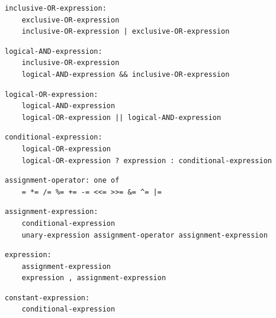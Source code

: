 \noindent\textbf{\texttt{}}\par
\begin{lstlisting}
inclusive-OR-expression:
    exclusive-OR-expression
    inclusive-OR-expression | exclusive-OR-expression
\end{lstlisting}

\noindent\textbf{\texttt{}}\par
\begin{lstlisting}
logical-AND-expression:
    inclusive-OR-expression
    logical-AND-expression && inclusive-OR-expression
\end{lstlisting}

\noindent\textbf{\texttt{}}\par
\begin{lstlisting}
logical-OR-expression:
    logical-AND-expression
    logical-OR-expression || logical-AND-expression
\end{lstlisting}

\noindent\textbf{\texttt{}}\par
\begin{lstlisting}
conditional-expression:
    logical-OR-expression
    logical-OR-expression ? expression : conditional-expression
\end{lstlisting}

\noindent\textbf{\texttt{}}\par
\begin{lstlisting}
assignment-operator: one of
    = *= /= %= += -= <<= >>= &= ^= |=
\end{lstlisting}

\noindent\textbf{\texttt{}}\par
\begin{lstlisting}
assignment-expression:
    conditional-expression
    unary-expression assignment-operator assignment-expression
\end{lstlisting}

\noindent\textbf{\texttt{}}\par
\begin{lstlisting}
expression:
    assignment-expression
    expression , assignment-expression
\end{lstlisting}

\noindent\textbf{\texttt{}}\par
\begin{lstlisting}
constant-expression:
    conditional-expression
\end{lstlisting}

